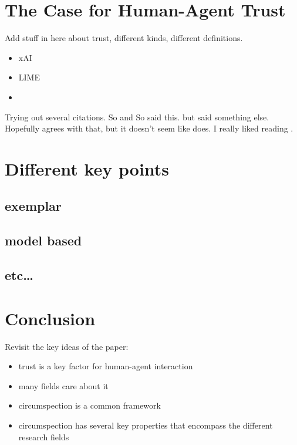 \section{The Case for Human-Agent Trust}
    Add stuff in here about trust, different kinds, different definitions.

    \begin{itemize}
        \item xAI
        \item LIME
        \item 
    \end{itemize}

    Trying out several citations. So and So \cite{Wang2016} said this. but \cite{Thompson1933} said something else. Hopefully \cite{Doyle2014} agrees with that, but it doesn't seem like \cite{Gelbart2015} does. I really liked reading \cite{Snoek2015}.

\section{Different key points}
    \subsection{exemplar}
    \subsection{model based}
    \subsection{etc\ldots}

\section{Conclusion}
    Revisit the key ideas of the paper:

    \begin{itemize}
        \item trust is a key factor for human-agent interaction
        \item many fields care about it
        \item circumspection is a common framework
        \item circumspection has several key properties that encompass the different research fields
    \end{itemize}

\newpage
